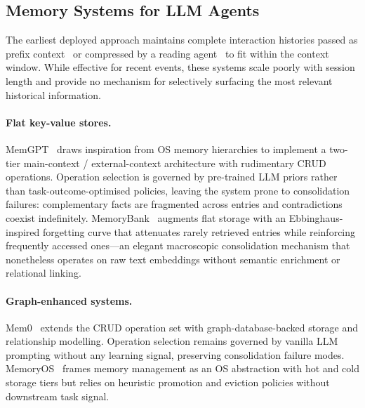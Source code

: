 \documentclass{article}
\begin{document}
\subsection{Memory Systems for LLM Agents}

The earliest deployed approach maintains complete interaction histories passed
as prefix context~\cite{maharana2024locomo} or compressed by a reading
agent~\cite{lee2024readagent} to fit within the context window.
While effective for recent events, these systems scale poorly with session
length and provide no mechanism for selectively surfacing the most relevant
historical information.

\paragraph{Flat key-value stores.}
MemGPT~\cite{packer2023memgpt} draws inspiration from OS memory hierarchies to
implement a two-tier main-context / external-context architecture with
rudimentary CRUD operations.
Operation selection is governed by pre-trained LLM priors rather than
task-outcome-optimised policies, leaving the system prone to consolidation
failures: complementary facts are fragmented across entries and contradictions
coexist indefinitely.
MemoryBank~\cite{zhong2024memorybank} augments flat storage with an
Ebbinghaus-inspired forgetting curve that attenuates rarely retrieved entries
while reinforcing frequently accessed ones---an elegant macroscopic
consolidation mechanism that nonetheless operates on raw text embeddings
without semantic enrichment or relational linking.

\paragraph{Graph-enhanced systems.}
Mem0~\cite{chhikara2025mem0} extends the CRUD operation set with
graph-database-backed storage and relationship modelling.
Operation selection remains governed by vanilla LLM prompting without any
learning signal, preserving consolidation failure modes.
MemoryOS~\cite{kang2025memoryos} frames memory management as an OS abstraction
with hot and cold storage tiers but relies on heuristic promotion and eviction
policies without downstream task signal.
\end{document}
